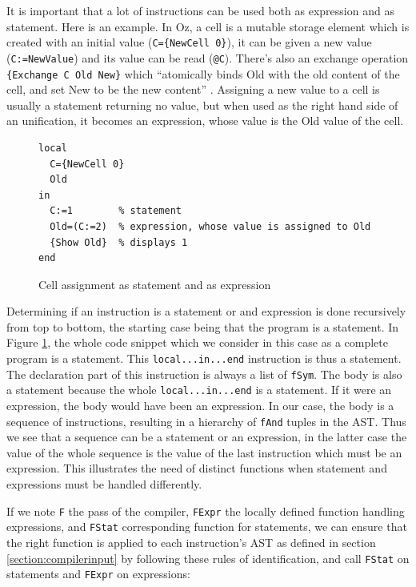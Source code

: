 \documentclass[a4paper]{memoir}
\begin{document}
It is important that a lot of instructions can be used both as expression and as
statement. Here is an example.
In Oz, a cell is a mutable storage element which is created with an initial value (\lstinline!C={NewCell 0}!), it can be given a new value (\lstinline!C:=NewValue!) and its value can be read (\lstinline!@C!). There's also an exchange operation \lstinline!{Exchange C Old New}! which ``atomically binds Old with the old content of the cell, and set New to be the new content'' \cite{VRH04}.%
Assigning a new value to a cell is usually a statement returning no value, but
when used as the right hand side of an unification, it becomes an expression,
whose value is the Old value of the cell.
\begin{figure}[h]
\begin{lstlisting}
local
  C={NewCell 0}
  Old
in
  C:=1        % statement
  Old=(C:=2)  % expression, whose value is assigned to Old
  {Show Old}  % displays 1
end

\end{lstlisting}
\caption{Cell assignment as statement and as expression}
\label{fig:statement_and_expression1}
\end{figure}

Determining if an instruction is a statement or and expression is done
recursively from top to bottom, the starting case being that the program is a
statement. In Figure \ref{fig:statement_and_expression1}, the
whole code snippet which we consider in this case as a complete program is a
statement. This \lstinline!local...in...end! instruction is thus a statement.
The declaration part of this instruction is always a list of \lstinline!fSym!. The body is
also a statement because the whole \lstinline!local...in...end! is a statement. If it were
an expression, the body
would have been an expression. In our case, the body is a sequence of
instructions, resulting in a hierarchy of \lstinline!fAnd! tuples in the AST. Thus we see that a sequence
can be a statement or an expression, in the latter case the value
of the whole sequence is the value of the last instruction which must be an expression. This illustrates the
need of distinct functions when statement and expressions must be handled
differently. 

If we note \lstinline!F! the pass of the compiler, \lstinline!FExpr! the locally defined
function handling expressions, and \lstinline!FStat! corresponding function for
statements, we can ensure that the right function is applied to each
instruction's AST as defined in section \ref{section:compilerinput} by following
these rules of identification, and call \lstinline!FStat! on statements and
\lstinline!FExpr! on expressions:
\end{document}
